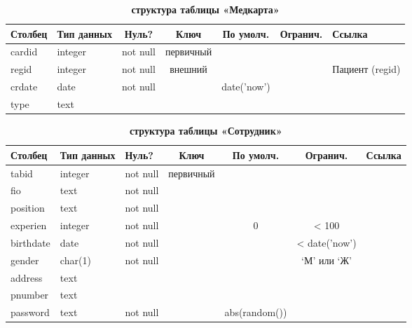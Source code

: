 \documentclass[14pt,a4paper,russian]{extreport}
\begin{document}
\begin{table}[h]
    \caption{ } 
    \begin{subtable}[t]{\textwidth}
        \caption{\textbf{структура таблицы «Медкарта»}}
    \begin{tabularx}{\textwidth}{| X | X | c | c | c | c | X |}
        \hline
        \textbf{Столбец} & \textbf{Тип данных} & \textbf{Нуль?} & \textbf{Ключ} & \textbf{По
        умолч.} & \textbf{Огранич.} & \textbf{Ссылка} \\ \hline
        cardid & integer & not null & первичный & & & \\ \hline
        regid & integer & not null & внешний & & & Пациент (regid) \\ \hline
        crdate & date & not null & & date('now') & & \\ \hline
        type & text & & & & & \\ \hline
    \end{tabularx}
    \end{subtable}
    \label{table:medcard}
\end{table}

\begin{table}[h]
    \caption{ } 
    \begin{subtable}[t]{\textwidth}
        \caption{\textbf{структура таблицы «Сотрудник»}}
    \begin{tabularx}{\textwidth}{| X | X | X | c | c | c | X |}
        \hline
        \textbf{Столбец} & \textbf{Тип данных} & \textbf{Нуль?} & \textbf{Ключ} & \textbf{По
        умолч.} & \textbf{Огранич.} & \textbf{Ссылка} \\ \hline
        tabid & integer & not null & первичный & & &  \\ \hline
        fio & text & not null & & & & \\ \hline
        position & text & not null & & & & \\ \hline
        experien & integer & not null & & 0 & < 100 & \\ \hline
        birthdate & date & not null & & & < date('now') & \\ \hline
        gender & char(1) & not null & & & `М' или `Ж' & \\ \hline
        address & text & & & & & \\ \hline
        pnumber & text & & & & & \\ \hline
        password & text & not null & & abs(random()) & & \\ \hline
    \end{tabularx}
    \end{subtable}
    \label{table:emp}
\end{table}
\end{document}
